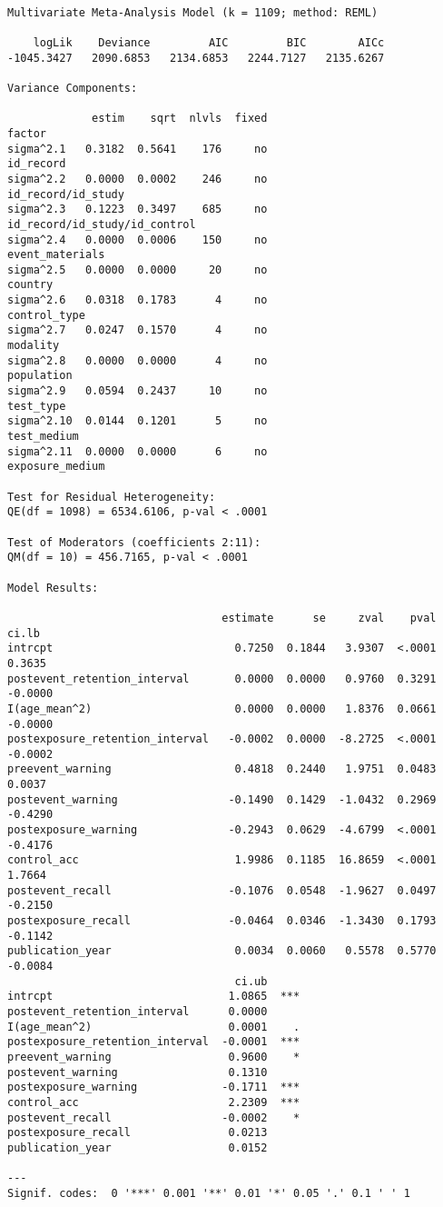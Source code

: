 \documentclass[
  letterpaper,
  DIV=11,
  numbers=noendperiod]{scrartcl}
\begin{document}
\begin{verbatim}

Multivariate Meta-Analysis Model (k = 1109; method: REML)

    logLik    Deviance         AIC         BIC        AICc   
-1045.3427   2090.6853   2134.6853   2244.7127   2135.6267   

Variance Components:

             estim    sqrt  nlvls  fixed                         factor 
sigma^2.1   0.3182  0.5641    176     no                      id_record 
sigma^2.2   0.0000  0.0002    246     no             id_record/id_study 
sigma^2.3   0.1223  0.3497    685     no  id_record/id_study/id_control 
sigma^2.4   0.0000  0.0006    150     no                event_materials 
sigma^2.5   0.0000  0.0000     20     no                        country 
sigma^2.6   0.0318  0.1783      4     no                   control_type 
sigma^2.7   0.0247  0.1570      4     no                       modality 
sigma^2.8   0.0000  0.0000      4     no                     population 
sigma^2.9   0.0594  0.2437     10     no                      test_type 
sigma^2.10  0.0144  0.1201      5     no                    test_medium 
sigma^2.11  0.0000  0.0000      6     no                exposure_medium 

Test for Residual Heterogeneity:
QE(df = 1098) = 6534.6106, p-val < .0001

Test of Moderators (coefficients 2:11):
QM(df = 10) = 456.7165, p-val < .0001

Model Results:

                                 estimate      se     zval    pval    ci.lb 
intrcpt                            0.7250  0.1844   3.9307  <.0001   0.3635 
postevent_retention_interval       0.0000  0.0000   0.9760  0.3291  -0.0000 
I(age_mean^2)                      0.0000  0.0000   1.8376  0.0661  -0.0000 
postexposure_retention_interval   -0.0002  0.0000  -8.2725  <.0001  -0.0002 
preevent_warning                   0.4818  0.2440   1.9751  0.0483   0.0037 
postevent_warning                 -0.1490  0.1429  -1.0432  0.2969  -0.4290 
postexposure_warning              -0.2943  0.0629  -4.6799  <.0001  -0.4176 
control_acc                        1.9986  0.1185  16.8659  <.0001   1.7664 
postevent_recall                  -0.1076  0.0548  -1.9627  0.0497  -0.2150 
postexposure_recall               -0.0464  0.0346  -1.3430  0.1793  -0.1142 
publication_year                   0.0034  0.0060   0.5578  0.5770  -0.0084 
                                   ci.ub      
intrcpt                           1.0865  *** 
postevent_retention_interval      0.0000      
I(age_mean^2)                     0.0001    . 
postexposure_retention_interval  -0.0001  *** 
preevent_warning                  0.9600    * 
postevent_warning                 0.1310      
postexposure_warning             -0.1711  *** 
control_acc                       2.2309  *** 
postevent_recall                 -0.0002    * 
postexposure_recall               0.0213      
publication_year                  0.0152      

---
Signif. codes:  0 '***' 0.001 '**' 0.01 '*' 0.05 '.' 0.1 ' ' 1
\end{verbatim}
\end{document}
